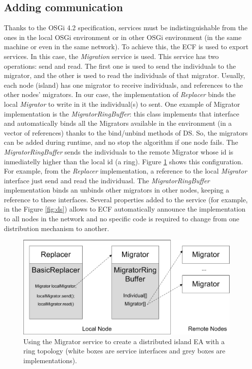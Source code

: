 \documentclass{sig-alternate}
\begin{document}
\subsection{Adding communication}
Thanks to the OSGi 4.2 specification, services must be indistinguishable from the ones in the local OSGi environment or in other OSGi environment (in the same machine or even in the same network). To achieve this, the ECF is used to export services. In this case, the {\em Migration} service is used. This service has two operations: send and read. The first one is used to send the individuals to the migrator, and the other is used to read the individuals of that migrator. Usually, each node (island) has one migrator to receive individuals, and references to the other nodes' migrators. In our case, the implementation of {\em Replacer} binds the local {\em Migrator} to write in it the individual(s) to sent. One example of Migrator implementation is the {\em MigratorRingBuffer}: this class implements that interface and automatically binds all the Migrators available in the environment (in a vector of references) thanks to the bind/unbind methods of DS. So, the migrators can be added during runtime, and no stop the algorithm if one node fails.  The {\em MigratorRingBuffer} sends the individuals to the remote Migrator whose id is inmediatelly higher than the local id (a ring). Figure \ref{MIGRATOR} shows this configuration. For example, from the {\em Replacer} implementation, a reference to the local {\em Migrator} interface just send and read the individuasl. The {\em MigratorRingBuffer} implementation binds an unbinds other migrators in other nodes, keeping a reference to these interfaces. Several properties added to the service (for example, in the Figure \ref{fig:ds}) allows to ECF automatically announce the implementation to all nodes in the network and no specific code is required to change from one distribution mechanism to another. 

\begin{figure}[ht] 
\begin{center} 
\includegraphics[scale=0.7]{images/migrator.eps}
\end{center} 
\caption{Using the Migrator service to create a distributed island EA with a ring topology (white boxes are service interfaces and grey boxes are implementations).} 
\label{MIGRATOR} 
\end{figure} 
\end{document}

